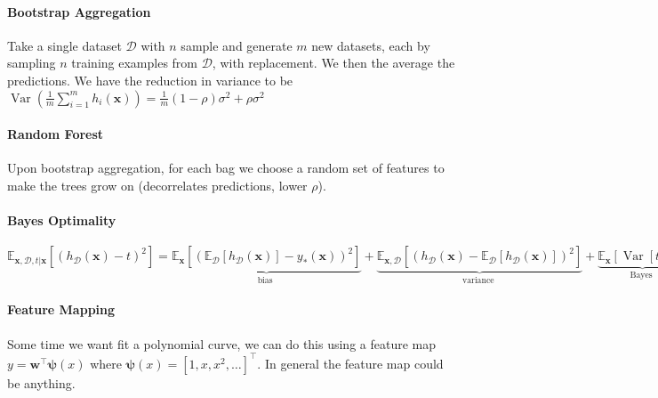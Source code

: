 \documentclass[10pt]{article}
\begin{document}
\paragraph{Bootstrap Aggregation} Take a single dataset $\mathcal{D}$ with $n$ sample and generate $m$ new datasets, each by sampling $n$ training examples from $\mathcal{D}$, with replacement. We then the average the predictions. We have the reduction in variance to be $\operatorname{Var}\left(\frac{1}{m} \sum_{i=1}^{m} h_{i}(\mathbf{x})\right)=\frac{1}{m}(1-\rho) \sigma^{2}+\rho \sigma^{2}$ 

\paragraph{Random Forest} Upon bootstrap aggregation, for each bag we choose a random set of features to make the trees grow on (decorrelates predictions, lower $\rho$). 

\paragraph{Bayes Optimality} $\mathbb{E}_{\mathbf{x}, \mathcal{D}, t | \mathbf{x}}\left[\left(h_{\mathcal{D}}(\mathbf{x})-t\right)^{2}\right]=  \underbrace{\mathbb{E}_{\mathbf{x}}\left[\left(\mathbb{E}_{\mathcal{D}}\left[h_{\mathcal{D}}(\mathbf{x})\right]-y_{*}(\mathbf{x})\right)^{2}\right]}_{\text {bias }}+\underbrace{\mathbb{E}_{\mathbf{x}, \mathcal{D}}\left[\left(h_{\mathcal{D}}(\mathbf{x})-\mathbb{E}_{\mathcal{D}}\left[h_{\mathcal{D}}(\mathbf{x})\right]\right)^{2}\right]}_{\text {variance }}+\underbrace{\mathbb{E}_{\mathbf{x}}[\operatorname{Var}[t | \mathbf{x}]]}_{\text {Bayes }} $



\paragraph{Feature Mapping} Some time we want fit a polynomial curve, we can do this using a feature map $y=\mathbf{w}^{\top} \boldsymbol{\psi}(x)$ where $\boldsymbol{\psi}(x)=\left[1, x, x^{2}, \ldots\right]^{\top}$. In general the feature map could be anything. 
\end{document}
